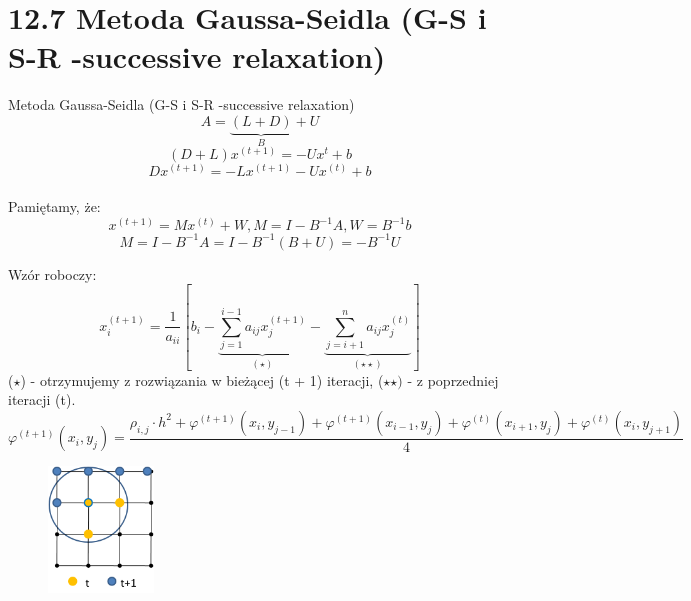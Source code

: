\section{12.7 Metoda Gaussa-Seidla (G-S i S-R -successive relaxation)}

\begin{frame}{Metoda Gaussa-Seidla (G-S i S-R -successive relaxation)}
  $$A=\underbrace{(L+D)}_{B}+U$$
  $$(D+L)x^{(t+1)}=-Ux^t+b$$
  $$\boxed{Dx^{(t+1)}=-Lx^{(t+1)}-Ux^{(t)}+b}$$
  \ \\
  Pamiętamy, że:
  $$x^{(t+1)} = M x^{(t)} + W, M=I-B^{-1}A, W = B^{-1}b$$
  $$M=I-B^{-1}A=I-B^{-1}(B+U)=-B^{-1}U $$
\end{frame}

\begin{frame}{}
  Wzór roboczy:
  $$x^{(t+1)}_i=\frac{1}{a_{ii}}[b_i-\underbrace{\sum^{i-1}_{j=1} a_{ij}x^{(t+1)}_j}_{(\star)}-\underbrace{\sum^{n}_{j=i+1} a_{ij}x^{(t)}_{j}}_{(\star\star)}]$$
   ($\star$) - otrzymujemy z rozwiązania w  bieżącej (t + 1) iteracji, ($\star\star)$ - z poprzedniej iteracji (t).
   \scriptsize{
		    $$
   \varphi^{(t+1)}(x_i,y_j)=
	 \frac{\rho_{i,j}\cdot h^2 +\varphi^{(t+1)}(x_{i},y_{j-1})  + \varphi^{(t+1)}(x_{i-1}, y_j)
	  +\varphi^{(t)}(x_{i+1},y_{j})
	 +\varphi^{(t)}(x_{i},y_{j+1})}{4} 
	 $$
	 }
   \begin{figure}
       \centering
       \includegraphics[width=0.25\textwidth]{img/12/gaussseidel.png}
   \end{figure} 
\end{frame}

